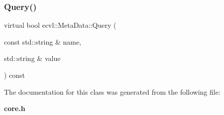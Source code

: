 \subsubsection{Query()}
{\footnotesize\ttfamily virtual bool ecvl\+::\+Meta\+Data\+::\+Query (\begin{DoxyParamCaption}\item[{const std\+::string \&}]{name,  }\item[{std\+::string \&}]{value }\end{DoxyParamCaption}) const\hspace{0.3cm}{\ttfamily [pure virtual]}}



The documentation for this class was generated from the following file\+:\begin{DoxyCompactItemize}
\item 
\textbf{ core.\+h}\end{DoxyCompactItemize}
